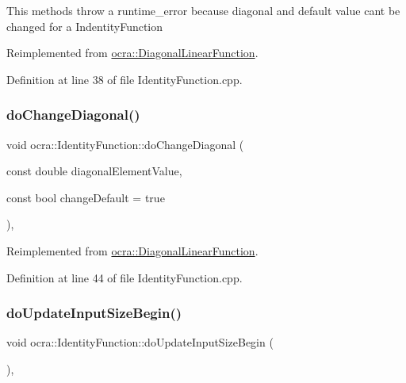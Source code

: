 This methods throw a runtime\+\_\+error because diagonal and default value can\textquotesingle{}t be changed for a Indentity\+Function 

Reimplemented from \hyperlink{classocra_1_1DiagonalLinearFunction_a5355515d58348a3eea92f36e35b1c7d5}{ocra\+::\+Diagonal\+Linear\+Function}.



Definition at line 38 of file Identity\+Function.\+cpp.

\hypertarget{classocra_1_1IdentityFunction_ac6350bcc2107b56e96642cacbbee2404}{}\label{classocra_1_1IdentityFunction_ac6350bcc2107b56e96642cacbbee2404} 
\subsubsection{\texorpdfstring{do\+Change\+Diagonal()}{doChangeDiagonal()}\hspace{0.1cm}{\footnotesize\ttfamily [2/2]}}
{\footnotesize\ttfamily void ocra\+::\+Identity\+Function\+::do\+Change\+Diagonal (\begin{DoxyParamCaption}\item[{const double}]{diagonal\+Element\+Value,  }\item[{const bool}]{change\+Default = {\ttfamily true} }\end{DoxyParamCaption})\hspace{0.3cm}{\ttfamily [protected]}, {\ttfamily [virtual]}}



Reimplemented from \hyperlink{classocra_1_1DiagonalLinearFunction_a0673bfe405d5637182c4749dd2737e95}{ocra\+::\+Diagonal\+Linear\+Function}.



Definition at line 44 of file Identity\+Function.\+cpp.

\hypertarget{classocra_1_1IdentityFunction_aa8d5ff0e25422b3b5a4a2a8621120790}{}\label{classocra_1_1IdentityFunction_aa8d5ff0e25422b3b5a4a2a8621120790} 
\subsubsection{\texorpdfstring{do\+Update\+Input\+Size\+Begin()}{doUpdateInputSizeBegin()}}
{\footnotesize\ttfamily void ocra\+::\+Identity\+Function\+::do\+Update\+Input\+Size\+Begin (\begin{DoxyParamCaption}{ }\end{DoxyParamCaption})\hspace{0.3cm}{\ttfamily [protected]}, {\ttfamily [virtual]}}

